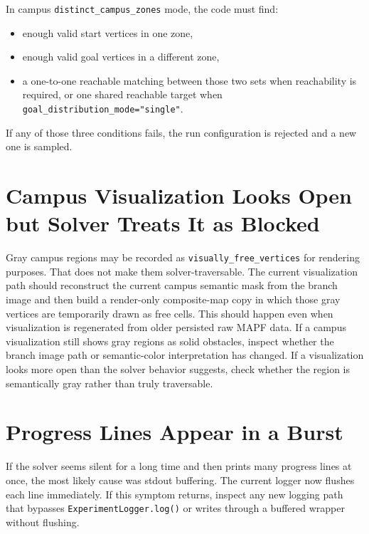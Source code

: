 \documentclass[11pt]{article}
\begin{document}
In campus \texttt{distinct\_campus\_zones} mode, the code must find:
\begin{itemize}[leftmargin=2em]
    \item enough valid start vertices in one zone,
    \item enough valid goal vertices in a different zone,
    \item a one-to-one reachable matching between those two sets when reachability is required, or one shared reachable target when \texttt{goal\_distribution\_mode="single"}.
\end{itemize}

If any of those three conditions fails, the run configuration is rejected and a new one is sampled.

\section{Campus Visualization Looks Open but Solver Treats It as Blocked}

Gray campus regions may be recorded as \texttt{visually\_free\_vertices} for rendering purposes. That does not make them solver-traversable. The current visualization path should reconstruct the current campus semantic mask from the branch image and then build a render-only composite-map copy in which those gray vertices are temporarily drawn as free cells. This should happen even when visualization is regenerated from older persisted raw MAPF data. If a campus visualization still shows gray regions as solid obstacles, inspect whether the branch image path or semantic-color interpretation has changed. If a visualization looks more open than the solver behavior suggests, check whether the region is semantically gray rather than truly traversable.

\section{Progress Lines Appear in a Burst}

If the solver seems silent for a long time and then prints many progress lines at once, the most likely cause was stdout buffering. The current logger now flushes each line immediately. If this symptom returns, inspect any new logging path that bypasses \texttt{ExperimentLogger.log()} or writes through a buffered wrapper without flushing.
\end{document}
